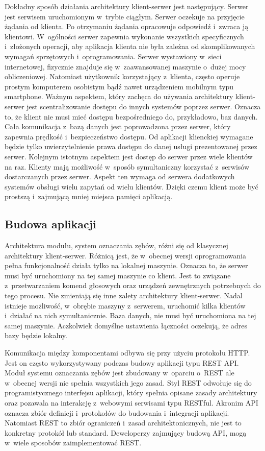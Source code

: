 Dokładny sposób działania architektury klient-serwer jest następujący. Serwer jest serwisem uruchomionym w~trybie ciągłym. Serwer oczekuje na przyjęcie żądania od klienta. Po otrzymaniu żądania opracowuje odpowiedź i~zwraca ją klientowi. W~ogólności serwer zapewnia wykonanie wszystkich specyficznych i~złożonych operacji, aby aplikacja klienta nie była zależna od skomplikowanych wymagań sprzętowych i~oprogramowania. Serwer wystawiony w~sieci internetowej, fizycznie znajduje się w~zaawansowanej maszynie o~dużej mocy obliczeniowej. Natomiast użytkownik korzystający z~klienta, często operuje prostym komputerem osobistym bądź nawet urządzeniem mobilnym typu smartphone. Ważnym aspektem, który zachęca do używania architektury klient-serwer jest scentralizowanie dostępu do innych systemów poprzez serwer. Oznacza to, że klient nie musi mieć dostępu bezpośredniego do, przykładowo, baz danych. Cała komunikacja z~bazą danych jest poprowadzona przez serwer, który zapewnia prędkość i~bezpieczeństwo dostępu. Od aplikacji klienckiej wymagane będzie tylko uwierzytelnienie prawa dostępu do danej usługi prezentowanej przez serwer. Kolejnym istotnym aspektem jest dostęp do serwer przez wiele klientów na raz. Klienty mają możliwość w~sposób symultaniczny korzystać z~serwisów dostarczanych przez serwer. Aspekt ten wymaga od serwera dodatkowych systemów obsługi wielu zapytań od wielu klientów. Dzięki czemu klient może być prostszą i~zajmującą mniej miejsca pamięci aplikacją.


\subsection{Budowa aplikacji}
Architektura modułu, system oznaczania zębów, różni się od klasycznej architektury klient-serwer. Różnicą jest, że w~obecnej wersji oprogramowania pełna funkcjonalność działa tylko na lokalnej maszynie. Oznacza to, że serwer musi być uruchomiony na tej samej maszynie co klient. Jest to związane z~przetwarzaniem komend głosowych oraz urządzeń zewnętrznych potrzebnych do tego procesu. Nie zmieniają się inne zalety architektury klient-serwer. Nadal istnieje możliwość, w~obrębie maszyny z~serwerem, uruchomić kilka klientów i~działać na nich symultanicznie. Baza danych, nie musi być uruchomiona na tej samej maszynie. Aczkolwiek domyślne ustawienia łączności oczekują, że adres bazy będzie lokalny.

Komunikacja między komponentami odbywa się przy użyciu protokołu HTTP. Jest on często wykorzystywany podczas budowy aplikacji typu REST API. Moduł systemu oznaczania zębów jest zbudowany w~oparciu o~REST ale w~obecnej wersji nie spełnia wszystkich jego zasad. Styl REST odwołuje się do programistycznego interfejsu aplikacji, który spełnia opisane zasady architektury oraz pozawala na interakcję z~webowymi serwisami typu RESTful.\cite{restapibook} Akronim API oznacza zbiór definicji i~protokołów do budowania i~integracji aplikacji. Natomiast REST to zbiór ograniczeń i~zasad architektonicznych, nie jest to konkretny protokół lub standard. Deweloperzy zajmujący budową API, mogą w~wiele sposobów zaimplementować REST.


